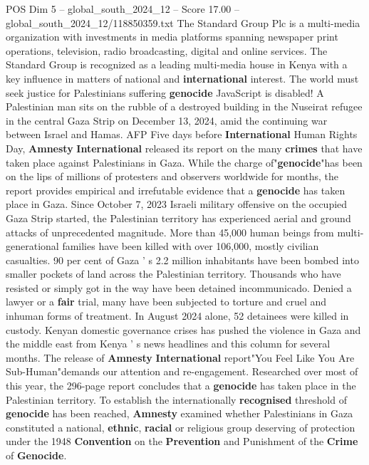 \begin{textsample}{POS Dim 5 – global\_south\_2024\_12 – Score 17.00 – global\_south\_2024\_12/118850359.txt}  \label{ex:f5_pos_047}
The Standard Group Plc is a multi-media organization with investments in media platforms spanning newspaper print operations, television, radio broadcasting, digital and online services.
The Standard Group is recognized as a leading multi-media house in Kenya with a key influence in matters of national and \textbf{international} interest.
The world must seek justice for Palestinians suffering \textbf{genocide} JavaScript is disabled!
A Palestinian man sits on the rubble of a destroyed building in the Nuseirat refugee in the central Gaza Strip on December 13, 2024, amid the continuing war between Israel and Hamas.
AFP Five days before \textbf{International} Human Rights Day, \textbf{Amnesty} \textbf{International} released its report on the many \textbf{crimes} that have taken place against Palestinians in Gaza.
While the charge of"\textbf{genocide}"has been on the lips of millions of protesters and observers worldwide for months, the report provides empirical and irrefutable evidence that a \textbf{genocide} has taken place in Gaza.
Since October 7, 2023 Israeli military offensive on the occupied Gaza Strip started, the Palestinian territory has experienced aerial and ground attacks of unprecedented magnitude.
More than 45,000 human beings from multi-generational families have been killed with over 106,000, mostly civilian casualties. 90 per cent of Gaza ' s 2.2 million inhabitants have been bombed into smaller pockets of land across the Palestinian territory.
Thousands who have resisted or simply got in the way have been detained incommunicado.
Denied a lawyer or a \textbf{fair} trial, many have been subjected to torture and cruel and inhuman forms of treatment.
In August 2024 alone, 52 detainees were killed in custody.
Kenyan domestic governance crises has pushed the violence in Gaza and the middle east from Kenya ' s news headlines and this column for several months.
The release of \textbf{Amnesty} \textbf{International} report"You Feel Like You Are Sub-Human"demands our attention and re-engagement.
Researched over most of this year, the 296-page report concludes that a \textbf{genocide} has taken place in the Palestinian territory.
To establish the internationally \textbf{recognised} threshold of \textbf{genocide} has been reached, \textbf{Amnesty} examined whether Palestinians in Gaza constituted a national, \textbf{ethnic}, \textbf{racial} or religious group deserving of protection under the 1948 \textbf{Convention} on the \textbf{Prevention} and Punishment of the \textbf{Crime} of \textbf{Genocide}.

\end{textsample}
